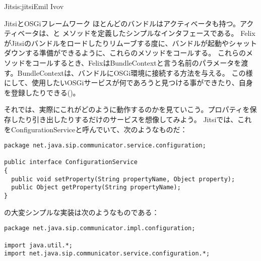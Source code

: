 \begin{aosachapter}{Jitsi}{s:jitsi}{Emil Ivov}
\begin{aosasect1}{JitsiとOSGiフレームワーク}
ほとんどのバンドルはアクティベータも持つ。アクティベータは、と メソッドを定義したシンプルなインタフェースである。
FelixがJitsiのバンドルをロードしたりリムーブする度に、バンドルが起動やシャットダウンする準備ができるように、これらのメソッドをコールする。
これらのメソッドをコールするとき、FelixはBundleContextと言う名前のパラメータを渡す。BundleContextは、バンドルにOSGi環境に接続する方法を与える。
この様にして、使用したいOSGiサービスが何であろうと見つける事ができたり、自身を登録したりできる()。


それでは、実際にこれがどのように動作するのかを見ていこう。プロパティを保存したり引き出したりするだけのサービスを想像してみよう。
Jitsiでは、これをConfigurationServiceと呼んでいて、次のようなものだ：

\pagebreak 

\begin{verbatim}
package net.java.sip.communicator.service.configuration;

public interface ConfigurationService
{
  public void setProperty(String propertyName, Object property);
  public Object getProperty(String propertyName);
}
\end{verbatim}

の大変シンプルな実装は次のようなものである：

\begin{verbatim}
package net.java.sip.communicator.impl.configuration;

import java.util.*;
import net.java.sip.communicator.service.configuration.*;


\end{verbatim}
\end{aosasect1}
\end{aosachapter}
